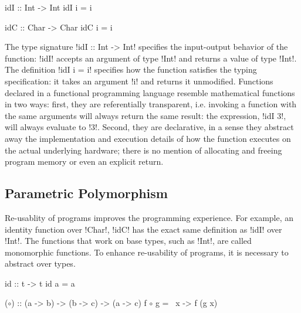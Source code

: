 \documentclass[screen,nonacm,manuscript,review]{acmart} %
\begin{document}
\begin{minipage}{0.5\linewidth}
\begin{CenteredBox}
\begin{code}
idI :: Int -> Int
idI i = i
\end{code}
\end{CenteredBox}
\end{minipage}%
\begin{minipage}{0.5\linewidth}
\begin{CenteredBox}
\begin{code}
idC :: Char -> Char
idC i = i
\end{code}
\end{CenteredBox}
\end{minipage}

The type signature !idI :: Int -> Int! specifies the input-output behavior of the
function: !idI! accepts an argument of type !Int! and returns a value of
type !Int!. The definition !idI i = i! specifies how the function satisfies the
typing specification: it takes an argument !i!
and returns it unmodified. Functions declared in a
functional programming language resemble mathematical functions
in two ways: first, they are referentially transparent,
i.e. invoking a function with the same
arguments will always return the same result:
the expression, !idI 3!, will always evaluate to !3!.
Second, they are declarative, in a sense they abstract away the
implementation and execution details of how the function executes on the
actual underlying hardware; there is no mention of allocating
and freeing program memory or even an explicit return.

\subsection{Parametric Polymorphism}
Re-usablity of programs improves the programming experience. For example, an
identity function over !Char!, !idC! has the exact same
definition as !idI! over !Int!. The functions that work on base types,
such as !Int!, are called monomorphic functions.
To enhance re-usability of programs, it is necessary to
abstract over types.

\begin{minipage}{0.5\linewidth}
\begin{CenteredBox}
\begin{code}
id :: t -> t
id a = a
\end{code}
\end{CenteredBox}
\end{minipage}%
\begin{minipage}[ht]{0.5\linewidth}
\begin{CenteredBox}
\begin{code}
($\circ$) :: (a -> b) -> (b -> c) -> (a -> c)
f $\circ$ g  = \ x -> f (g x)
\end{code}
\end{CenteredBox}
\end{minipage}
\end{document}
